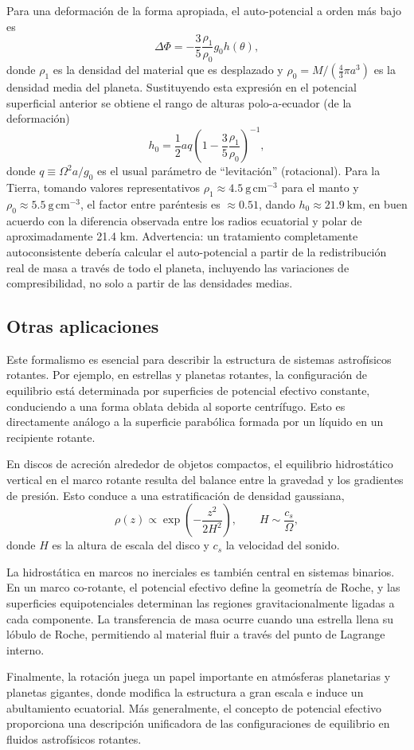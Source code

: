 Para una deformación de la forma apropiada, el auto-potencial a orden más bajo es
$$ \Delta\Phi = -\frac{3}{5}\frac{\rho_1}{\rho_0}g_0 h(\theta), $$
donde $\rho_1$ es la densidad del material que es desplazado y $\rho_0 = M/\left(\frac{4}{3}\pi a^3\right)$ es la densidad media del planeta. Sustituyendo esta expresión en el potencial superficial anterior se obtiene el rango de alturas polo-a-ecuador (de la deformación)
$$ h_0 = \frac{1}{2}aq\left(1 - \frac{3}{5}\frac{\rho_1}{\rho_0}\right)^{-1}, $$
donde $q \equiv \Omega^2 a/g_0$ es el usual parámetro de ``levitación'' (rotacional). Para la Tierra, tomando valores representativos $\rho_1 \approx 4.5\ \mathrm{g\,cm^{-3}}$ para el manto y $\rho_0 \approx 5.5\ \mathrm{g\,cm^{-3}}$, el factor entre paréntesis es $\approx 0.51$, dando $h_0 \approx 21.9\ \mathrm{km}$, en buen acuerdo con la diferencia observada entre los radios ecuatorial y polar de aproximadamente 21.4 km. Advertencia: un tratamiento completamente autoconsistente debería calcular el auto-potencial a partir de la redistribución real de masa a través de todo el planeta, incluyendo las variaciones de compresibilidad, no solo a partir de las densidades medias.

\subsection{Otras aplicaciones}

Este formalismo es esencial para describir la estructura de sistemas astrofísicos rotantes. Por ejemplo, en estrellas y planetas rotantes, la configuración de equilibrio está determinada por superficies de potencial efectivo constante, conduciendo a una forma oblata debida al soporte centrífugo. Esto es directamente análogo a la superficie parabólica formada por un líquido en un recipiente rotante.

En discos de acreción alrededor de objetos compactos, el equilibrio hidrostático vertical en el marco rotante resulta del balance entre la gravedad y los gradientes de presión. Esto conduce a una estratificación de densidad gaussiana,
$$ \rho(z) \propto \exp\left(-\frac{z^2}{2H^2}\right), \qquad H \sim \frac{c_s}{\Omega}, $$
donde $H$ es la altura de escala del disco y $c_s$ la velocidad del sonido.

La hidrostática en marcos no inerciales es también central en sistemas binarios. En un marco co-rotante, el potencial efectivo define la geometría de Roche, y las superficies equipotenciales determinan las regiones gravitacionalmente ligadas a cada componente. La transferencia de masa ocurre cuando una estrella llena su lóbulo de Roche, permitiendo al material fluir a través del punto de Lagrange interno.

Finalmente, la rotación juega un papel importante en atmósferas planetarias y planetas gigantes, donde modifica la estructura a gran escala e induce un abultamiento ecuatorial. Más generalmente, el concepto de potencial efectivo proporciona una descripción unificadora de las configuraciones de equilibrio en fluidos astrofísicos rotantes.